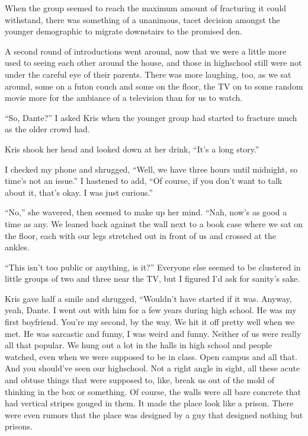 When the group seemed to reach the maximum amount of fracturing it could withstand, there was something of a unanimous, tacet decision amongst the younger demographic to migrate downstairs to the promised den.

A second round of introductions went around, now that we were a little more used to seeing each other around the house, and those in highschool still were not under the careful eye of their parents.  There was more laughing, too, as we sat around, some on a futon couch and some on the floor, the TV on to some random movie more for the ambiance of a television than for us to watch.

``So, Dante?'' I asked Kris when the younger group had started to fracture much as the older crowd had.

Kris shook her head and looked down at her drink, ``It's a long story.''

I checked my phone and shrugged, ``Well, we have three hours until midnight, so time's not an issue.''  I hastened to add, ``Of course, if you don't want to talk about it, that's okay.  I was just curious.''

``No,'' she wavered, then seemed to make up her mind.  ``Nah, now's as good a time as any.  We leaned back against the wall next to a book case where we sat on the floor, each with our legs stretched out in front of us and crossed at the ankles.

``This isn't too public or anything, is it?''  Everyone else seemed to be clustered in little groups of two and three near the TV, but I figured I'd ask for sanity's sake.

Kris gave half a smile and shrugged, ``Wouldn't have started if it was.  Anyway, yeah, Dante.  I went out with him for a few years during high school.  He was my first boyfriend.  You're my second, by the way.  We hit it off pretty well when we met.  He was sarcastic and funny, I was weird and funny.  Neither of us were really all that popular.  We hung out a lot in the halls in high school and people watched, even when we were supposed to be in class.  Open campus and all that.  And you should've seen our highschool.  Not a right angle in sight, all these acute and obtuse things that were supposed to, like, break us out of the mold of thinking in the box or something.  Of course, the walls were all bare concrete that had vertical stripes gouged in them.  It made the place look like a prison.  There were even rumors that the place was designed by a guy that designed nothing but prisons.

